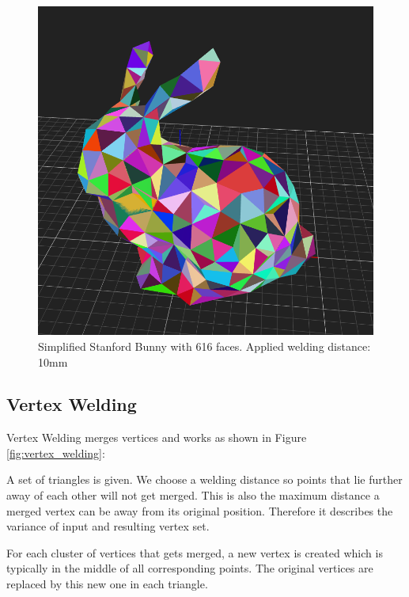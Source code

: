 \documentclass[../ClassicThesis.tex]{subfiles}
\begin{document}
\begin{figure}
\includegraphics[width=0.8\columnwidth]{Images/04-approx-welding-rabbit-10mm.png}
\caption{Simplified Stanford Bunny with 616 faces. Applied welding distance: 10mm}
\label{fig:10mmBunny}
\end{figure}




\subsection{Vertex Welding}
\label{sec:vertex_welding}










Vertex Welding merges vertices and works as shown in Figure \ref{fig:vertex_welding}:

A set of triangles is given. We choose a welding distance so points that lie further away of each other will not get merged. This is also the maximum distance a merged vertex can be away from its original position. Therefore it describes the variance of input and resulting vertex set.

For each cluster of vertices that gets merged, a new vertex is created which is typically in the middle of all corresponding points. The original vertices are replaced by this new one in each triangle.
\end{document}
